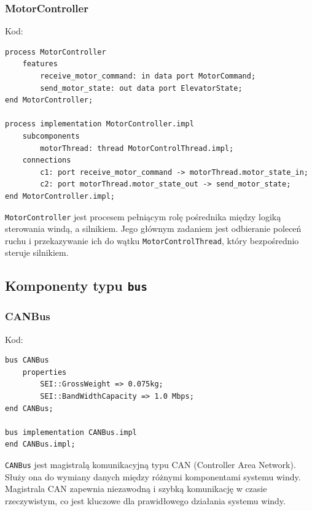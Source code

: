 \documentclass{article}
\begin{document}
    \subsubsection{MotorController}

    Kod:
    
    \begin{lstlisting}[basicstyle=\ttfamily, keywordstyle=\bfseries]
process MotorController
    features
        receive_motor_command: in data port MotorCommand;
        send_motor_state: out data port ElevatorState;
end MotorController;

process implementation MotorController.impl
    subcomponents
        motorThread: thread MotorControlThread.impl; 
    connections
        c1: port receive_motor_command -> motorThread.motor_state_in;
        c2: port motorThread.motor_state_out -> send_motor_state;
end MotorController.impl;
    \end{lstlisting}

    \texttt{MotorController} jest procesem pełniącym rolę pośrednika między logiką sterowania windą, a silnikiem. Jego głównym zadaniem jest odbieranie poleceń ruchu i przekazywanie ich do wątku \texttt{MotorControlThread}, który bezpośrednio steruje silnikiem.










    \subsection{Komponenty typu \texttt{bus}}

    
    \subsubsection{CANBus}

    Kod:
    
    \begin{lstlisting}[basicstyle=\ttfamily, keywordstyle=\bfseries]
bus CANBus
    properties
        SEI::GrossWeight => 0.075kg;
        SEI::BandWidthCapacity => 1.0 Mbps; 
end CANBus;

bus implementation CANBus.impl
end CANBus.impl;
    \end{lstlisting}

    \texttt{CANBus} jest magistralą komunikacyjną typu CAN (Controller Area Network). Służy ona do wymiany danych między różnymi komponentami systemu windy. Magistrala CAN zapewnia niezawodną i szybką komunikację w czasie rzeczywistym, co jest kluczowe dla prawidłowego działania systemu windy.
\end{document}
